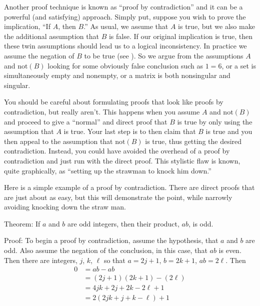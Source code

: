 \begin{para}Another proof technique is known as ``proof by contradiction'' and it can be a powerful (and satisfying) approach.  Simply put, suppose you wish to prove the implication, ``If $A$, then $B$.''   As usual, we assume that $A$ is true, but we also make the additional assumption that $B$ is false.  If our original implication is true, then these twin assumptions should lead us to a logical inconsistency.  In practice we assume the negation of $B$ to be true (see ).  So we argue from the assumptions $A$ and $\text{not}(B)$ looking for some obviously false conclusion such as $1=6$, or a set is simultaneously empty and nonempty, or a matrix is both nonsingular and singular.\end{para}
%
\begin{para}You should be careful about formulating proofs that look like proofs by contradiction, but really aren't.  This happens when you assume $A$ and $\text{not}(B)$ and proceed to give a ``normal'' and direct proof that $B$ is true by only using the assumption that $A$ is true.  Your last step is to then claim that $B$ is true and you then appeal to the assumption that $\text{not}(B)$ is true, thus getting the desired contradiction.  Instead, you could have avoided the overhead of a proof by contradiction and just run with the direct proof.  This stylistic flaw is known, quite graphically, as ``setting up the strawman to knock him down.''\end{para}
%
\begin{para}Here is a simple example of a proof by contradiction.  There are direct proofs that are just about as easy, but this will demonstrate the point, while narrowly avoiding knocking down the straw man.\end{para}
%
\begin{para}Theorem:  If $a$ and $b$ are odd integers, then their product, $ab$, is odd.\end{para}
%
\begin{para}Proof:  To begin a proof by contradiction, assume the hypothesis, that $a$ and $b$ are odd.  Also assume the negation of the conclusion, in this case, that $ab$ is even.  Then there are integers, $j$, $k$, $\ell$ so that $a=2j+1$, $b=2k+1$, $ab=2\ell$.  Then
%
\begin{align*}
0
&=ab-ab\\
&=(2j+1)(2k+1)-(2\ell)\\
&=4jk+2j+2k-2\ell+1\\
&=2\left(2jk+j+k-\ell\right)+1\\
\end{align*}
\end{para}
